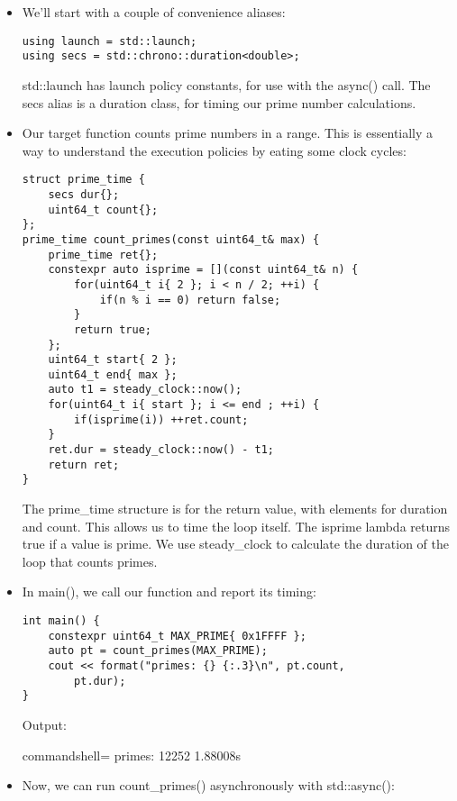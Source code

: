 \begin{itemize}
\item 
We'll start with a couple of convenience aliases:

\begin{lstlisting}[style=styleCXX]
using launch = std::launch;
using secs = std::chrono::duration<double>;
\end{lstlisting}

std::launch has launch policy constants, for use with the async() call. The secs alias is a duration class, for timing our prime number calculations.

\item 
Our target function counts prime numbers in a range. This is essentially a way to understand the execution policies by eating some clock cycles:

\begin{lstlisting}[style=styleCXX]
struct prime_time {
	secs dur{};
	uint64_t count{};
};
prime_time count_primes(const uint64_t& max) {
	prime_time ret{};
	constexpr auto isprime = [](const uint64_t& n) {
		for(uint64_t i{ 2 }; i < n / 2; ++i) {
			if(n % i == 0) return false;
		}
		return true;
	};
	uint64_t start{ 2 };
	uint64_t end{ max };
	auto t1 = steady_clock::now();
	for(uint64_t i{ start }; i <= end ; ++i) {
		if(isprime(i)) ++ret.count;
	}
	ret.dur = steady_clock::now() - t1;
	return ret;
}
\end{lstlisting}

The prime\_time structure is for the return value, with elements for duration and count. This allows us to time the loop itself. The isprime lambda returns true if a value is prime. We use steady\_clock to calculate the duration of the loop that counts primes.

\item 
In main(), we call our function and report its timing:

\begin{lstlisting}[style=styleCXX]
int main() {
	constexpr uint64_t MAX_PRIME{ 0x1FFFF };
	auto pt = count_primes(MAX_PRIME);
	cout << format("primes: {} {:.3}\n", pt.count,
		pt.dur);
}
\end{lstlisting}

Output:

\begin{tcblisting}{commandshell={}}
primes: 12252 1.88008s
\end{tcblisting}

\item 
Now, we can run count\_primes() asynchronously with std::async():


\end{itemize}
